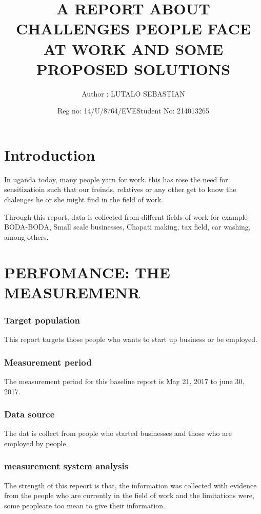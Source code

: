\documentclass{article}
\begin{document}
		\title{A REPORT ABOUT CHALLENGES PEOPLE FACE AT WORK AND SOME PROPOSED SOLUTIONS }
		\author{Author :  LUTALO SEBASTIAN }
	           \date{Reg no: 14/U/8764/EVE}
                      \date{Student No: 214013265}
                   
		\maketitle
	

	\tableofcontents


\section{Introduction}
In uganda today, many people yarn for work. this has rose the need for sensitizatioin such that our freinds, relatives or any other get to know the chalenges he or she might find in the field of work.

Through this report, data is collected from differnt fields of work for example BODA-BODA,  Small scale businesses, Chapati making, tax field, car washing, among others.

\section{PERFOMANCE: THE MEASUREMENR}

\subsubsection{Target population}
This report targets those people who wants to start up business or be employed. 
\subsubsection{Measurement period}
The measurement period for this baseline  report is May 21, 2017 to june 30, 2017.
\subsubsection{Data source}
The dat is collect from people who started businesses and those who are employed by people.
\subsubsection{measurement system analysis}
The strength of this repeort is that, the information was collected with evidence from the people who are currently in the field of work and the limitations were, some peopleare too mean to give their information.
\end{document}

